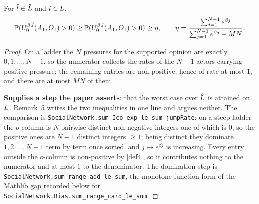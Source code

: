 \begin{lemma}
  \label{rem5-eta}
  \leanok
  For $\hat{l} \in \hat{L}$ and $l \in L$,
  \[
    \mathbb{P}(U^{\beta,\hat{l}}_0(A_1,O_1) > 0)
      \ge \mathbb{P}(U^{\beta,l}_0(A_1,O_1) > 0) \ge \eta,
    \qquad
    \eta = \frac{\sum_{j=1}^{N-1} e^{\beta j}}
                {\sum_{j=0}^{N-1} e^{\beta j} + MN} .
  \]
\end{lemma}
\begin{proof}
  \leanok
  On a ladder the $N$ pressures for the supported opinion are exactly
  $0, 1, \dots, N-1$, so the numerator collects the rates of the $N-1$ actors
  carrying positive pressure; the remaining entries are non-positive, hence of
  rate at most $1$, and there are at most $MN$ of them.

  \textbf{Supplies a step the paper asserts}: that the worst case over $\hat{L}$
  is attained on $L$.  Remark~5 writes the two inequalities in one line
  and argues neither.  The comparison is
  \texttt{SocialNetwork.sum\_Ico\_exp\_le\_sum\_jumpRate}: on a steep ladder
  the $o$-column is $N$ pairwise distinct non-negative integers one of which is
  $0$, so the positive ones are $N-1$ distinct integers $\ge 1$; being distinct
  they dominate $1, 2, \dots, N-1$ term by term once sorted, and $j \mapsto
  e^{\beta j}$ is increasing.  Every entry outside the $o$-column is
  non-positive by \ref{def4}, so it contributes nothing to the numerator and at
  most $1$ to the denominator.  The domination step is
  \texttt{SocialNetwork.sum\_range\_add\_le\_sum}, the monotone-function form
  of the Mathlib gap recorded below for
  \texttt{SocialNetwork.Bias.sum\_range\_card\_le\_sum}.

\end{proof}

